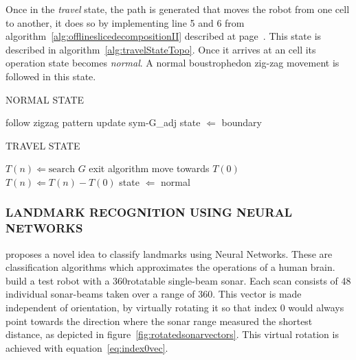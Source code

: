 Once in the \emph{travel} state, the path is generated that moves the robot from one cell to another, it does so by implementing line 5 and 6 from algorithm~\ref{alg:offlineslicedecompositionII} described at page~\pageref{alg:offlineslicedecompositionII}. This state is described in algorithm~\ref{alg:travelStateTopo}.
Once it arrives at an cell its operation state becomes \emph{normal}. A normal boustrophedon zig-zag movement is followed in this state.

\begin{RoyalAlgorithm}[label=alg:normalStateTopo]{NORMAL STATE}
	\begin{algorithmic}[1]
		\Repeat
			\State follow zigzag pattern
		\State update \gls{sym-G_adj}
		\State state $ \Leftarrow $ boundary
		\EndProcedure
	\end{algorithmic}
\end{RoyalAlgorithm}

\begin{RoyalAlgorithm}[label=alg:travelStateTopo]{TRAVEL STATE}
	\begin{algorithmic}[1]
		\State $ T(n) \Leftarrow \text{search } G $
			\State exit algorithm
		\EndIf
			\State move towards $ T(0) $
				$ T(n) \Leftarrow T(n) - { T(0) } $
			\EndIf
		\EndWhile
		\State state $ \Leftarrow $ normal
		\EndProcedure
	\end{algorithmic}
\end{RoyalAlgorithm}

\subsubsection{LANDMARK RECOGNITION USING NEURAL NETWORKS}
\citet{wong_qualitative_2006} proposes a novel idea to classify landmarks using Neural Networks. These are classification algorithms which approximates the operations of a human brain. \citeauthor{wong_qualitative_2006} build a test robot with a 360\textdegree rotatable single-beam sonar. Each scan consists of 48 individual sonar-beams taken over a range of 360\textdegree. This vector is made independent of orientation, by virtually rotating it so that index 0 would always point towards the direction where the sonar range measured the shortest distance, as depicted in figure~\ref{fig:rotatedsonarvectors}. This virtual rotation is achieved with equation~\ref{eq:index0vec}.

